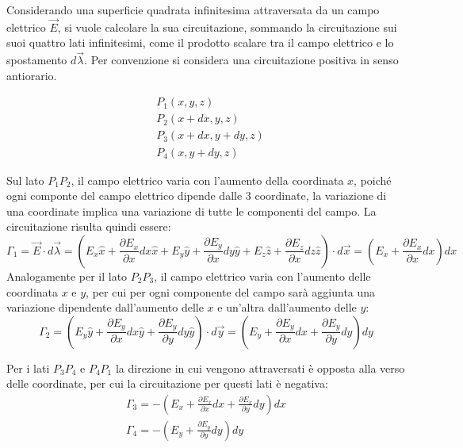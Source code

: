 \documentclass{article}
\numberwithin{equation}{subsection}
\begin{document}
Considerando una superficie quadrata infinitesima attraversata da un campo elettrico $\vec{E}$, si vuole calcolare la sua circuitazione, sommando la circuitazione sui suoi 
quattro lati infinitesimi, come il prodotto scalare tra il campo elettrico e lo spostamento $d\vec{\lambda}$. Per convenzione si considera una circuitazione positiva in senso 
antiorario. 
\begin{center}
\end{center}
\begin{align*}
    &P_1(x,y,z)\\
    &P_2(x+dx,y,z)\\
    &P_3(x+dx,y+dy,z)\\
    &P_4(x,y+dy,z)
\end{align*}

Sul lato $P_1P_2$, il campo elettrico varia con l'aumento della coordinata $x$, poiché ogni componte del campo elettrico dipende dalle $3$ coordinate, la variazione di una 
coordinate implica una variazione di tutte le componenti del campo. La circuitazione risulta quindi essere:
\begin{equation*}
    \Gamma_1=\vec{E}\cdot d\vec{\lambda}=\left(E_x\hat{x}+\displaystyle\frac{\partial E_x}{\partial x}dx\hat{x}+E_y\hat{y}+\frac{\partial E_y}{\partial x}dy\hat{y}+E_z\hat{z}+\frac{\partial E_z}{\partial x}dz\hat{z}\right)\cdot d\vec{x}=\left(E_x+\frac{\partial E_x}{\partial x}dx\right)dx
\end{equation*}
Analogamente per il lato $P_2P_3$, il campo elettrico varia con l'aumento delle coordinata $x$ e $y$, per cui per ogni componente del campo sarà aggiunta una variazione dipendente 
dall'aumento delle $x$ e un'altra dall'aumento delle $y$:
\begin{equation*}
    \Gamma_2=\left(E_y\hat{y}+\displaystyle\frac{\partial E_y}{\partial x}dx\hat{y}+\frac{\partial E_y}{\partial y}dy\hat{y}\right)\cdot d\vec{y}=\left(E_y+\frac{\partial E_y}{\partial x}dx+\frac{\partial E_y}{\partial y}dy\right)dy
\end{equation*}

Per i lati $P_3P_4$ e $P_4P_1$ la direzione in cui vengono attraversati è opposta alla verso delle coordinate, per cui la circuitazione per questi lati è negativa:
\begin{gather*}
    \Gamma_3=-\left(E_x+\displaystyle\frac{\partial E_x}{\partial x}dx+\frac{\partial E_x}{\partial y}dy\right)dx\\
    \Gamma_4=-\left(E_y+\displaystyle\frac{\partial E_y}{\partial y}dy\right)dy
\end{gather*} 
\end{document}
